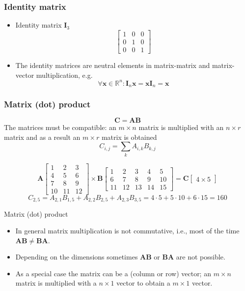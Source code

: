 \documentclass[notes]{beamer}          %
\newcommand{\vect}[1]{\bm{#1}}
\newcommand{\field}[1]{\mathbb{#1}}
\newcommand{\R}{\field{R}}
\begin{document}
\begin{frame}
\frametitle{Identity matrix}
    \begin{itemize}
        \item Identity matrix $\vect{I}_3$
        $$\begin{bmatrix}
            1 & 0 & 0 \\
            0 & 1 & 0 \\
            0 & 0 & 1
          \end{bmatrix}$$

        \item The identity matrices are neutral elements in matrix-matrix and matrix-vector multiplication, e.g.
        $$\forall \vect{x} \in \R^n: \vect{I}_n \vect{x} = \vect{x} \vect{I}_n = \vect{x} $$
    \end{itemize}

\end{frame}

\begin{frame}
\frametitle{Matrix (dot) product}

    $$\vect{C} = \vect{A}\vect{B}$$
    The matrices must be compatible: an $m \times n$ matrix is multiplied with an $n \times r$ matrix and as a result an $m \times r$ matrix is obtained
    $$C_{i,j} = \sum_k A_{i,k}B_{k,j}$$

    $$
    \vect{A}
    \begin{bmatrix}
       1 & 2 & 3 \\
       4 & 5 & 6 \\
       7 & 8 & 9 \\
       10 & 11 & 12
    \end{bmatrix}
    \times
    \vect{B}
    \begin{bmatrix}
        1 & 2 & 3 & 4 & 5 \\
        6 & 7 & 8 & 9 & 10 \\
        11 & 12 & 13 & 14 & 15
    \end{bmatrix} =
    \vect{C}
    \begin{bmatrix}
       4 \times 5
    \end{bmatrix}
    $$
    $$ C_{2,5} = A_{2,1}B_{1,5} + A_{2,2}B_{2,5} + A_{2,3}B_{3,5} = 4 \cdot 5 + 5 \cdot 10 + 6 \cdot 15 = 160 $$

\end{frame}

\begin{frame}{Matrix (dot) product}
    \begin{itemize}
        \item In general matrix multiplication is not commutative, i.e., most of the time $\vect{A}\vect{B} \not = \vect{B}\vect{A}$.
        \item Depending on the dimensions sometimes $\vect{A} \vect{B}$ or $\vect{B} \vect{A}$ are not possible.
        \item As a special case the matrix can be a (column or row) vector; an $m \times n$ matrix is multiplied with a $n \times 1$ vector to obtain a $m \times 1$ vector.
    \end{itemize}
\end{frame}
\end{document}
